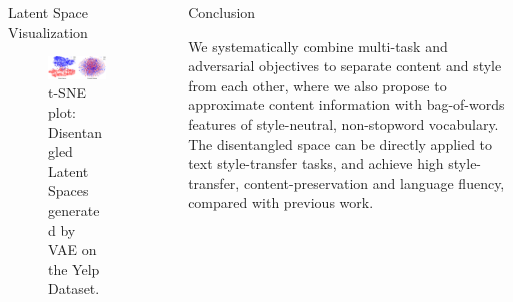 \documentclass[final]{beamer}
\newlength{\sepwid}
\newlength{\onecolwid}
\newlength{\twocolwid}
\begin{document}
\begin{frame}[t]
\begin{columns}[t]
\begin{column}{\twocolwid}
\begin{columns}[t,totalwidth=\twocolwid]
\begin{column}{\onecolwid}
                    \begin{block}{Latent Space Visualization}
                        \begin{figure}
                            \includegraphics[width=\linewidth]{vae-latent-spaces}
                            \caption{t-SNE plot: Disentangled Latent Spaces generated by VAE on the Yelp Dataset.}
                            \label{fig:tsne-plot}
                        \end{figure}
                    \end{block}


                \end{column} %

            \end{columns} %

        \end{column} %

        \begin{column}{\sepwid}\end{column} %

        \begin{column}{\onecolwid} %


            \begin{block}{Conclusion}

                We systematically combine multi-task and adversarial objectives to separate content and style from each other, where we also propose to approximate content information with bag-of-words features of style-neutral, non-stopword vocabulary.
                The disentangled space can be directly applied to text style-transfer tasks, and achieve high style-transfer, content-preservation and language fluency, compared with previous work.


\end{block}
\end{column}
\end{columns}
\end{frame}
\end{document}
